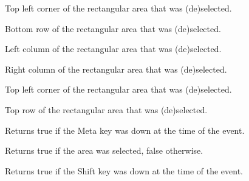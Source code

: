 
Top left corner of the rectangular area that was (de)selected.

\label{wxgridrangeselecteventgetbottomrow}


Bottom row of the rectangular area that was (de)selected.

\label{wxgridrangeselecteventgetleftcol}


Left column of the rectangular area that was (de)selected.

\label{wxgridrangeselecteventgetrightcol}


Right column of the rectangular area that was (de)selected.

\label{wxgridrangeselecteventgettopleftcoords}


Top left corner of the rectangular area that was (de)selected.

\label{wxgridrangeselecteventgettoprow}


Top row of the rectangular area that was (de)selected.

\label{wxgridrangeselecteventmetadown}


Returns true if the Meta key was down at the time of the event.

\label{wxgridrangeselecteventselecting}


Returns true if the area was selected, false otherwise.

\label{wxgridrangeselecteventshiftdown}


Returns true if the Shift key was down at the time of the event.

